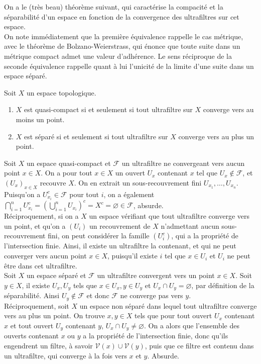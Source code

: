 \documentclass{article}
\begin{document}
On a le (très beau) théorème suivant, qui caractérise la compacité et la séparabilité d'un espace en fonction de la convergence des ultrafiltres sur cet espace.\\
On note immédiatement que la première équivalence rappelle le cas métrique, avec le théorème de Bolzano-Weierstrass, qui énonce que toute suite dans un métrique compact admet une valeur d'adhérence.
Le sens réciproque de la seconde équivalence rappelle quant à lui l'unicité de la limite d'une suite dans un espace séparé.\\
\begin{theoreme}
    Soit $X$ un espace topologique.
    \begin{enumerate}
        \item $X$ est quasi-compact si et seulement si tout ultrafiltre sur $X$ converge vers au moins un point.
        \item $X$ est séparé si et seulement si tout ultrafiltre sur $X$ converge vers au plus un point.
    \end{enumerate}
\end{theoreme}
\begin{preuve}
    Soit $X$ un espace quasi-compact et $\mathcal{F}$ un ultrafiltre ne convergeant vers aucun point $x \in X$. On a pour tout $x \in X$ un ouvert $U_x$ contenant $x$ tel que $U_x \not\in \mathcal{F}$, et $(U_x)_{x \in X}$ recouvre $X$. On en extrait un sous-recouvrement fini $U_{x_1}, \ldots, U_{x_n}$.\\
    Puisqu'on a $U_{x_i}^c \in \mathcal{F}$ pour tout $i$, on a également $\bigcap_{i=1}^{n}{U_{x_i}^c} = \left(\bigcup_{i=1}^{n}{U_{x_i}}\right)^c = X^c = \varnothing \in \mathcal{F}$, absurde.\\

    Réciproquement, si on a $X$ un espace vérifiant que tout ultrafiltre converge vers un point, et qu'on a $(U_i)$ un recouvrement de $X$ n'admettant aucun sous-recouvrement fini, on peut considérer la famille $(U_i^c)$, qui a la propriété de l'intersection finie. Ainsi, il existe un ultrafiltre la contenant, et qui ne peut converger vers aucun point $x \in X$, puisqu'il existe $i$ tel que $x \in U_i$ et $U_i$ ne peut être dans cet ultrafiltre.\\

    Soit $X$ un espace séparé et $\mathcal{F}$ un ultrafiltre convergent vers un point $x \in X$.
    Soit $y \in X$, il existe $U_x, U_y$ tels que $x \in U_x, y \in U_y$ et $U_x \cap U_y = \varnothing$, par définition de la séparabilité. Ainsi $U_y \not\in \mathcal{F}$ et donc $\mathcal{F}$ ne converge pas vers $y$.\\

    Réciproquement, soit $X$ un espace non séparé dans lequel tout ultrafiltre converge vers au plus un point.
    On trouve $x, y \in X$ tels que pour tout ouvert $U_x$ contenant $x$ et tout ouvert $U_y$ contenant $y$, $U_x \cap U_y \neq \varnothing$. On a alors que l'ensemble des ouverts contenant $x$ ou $y$ a la propriété de l'intersection finie, donc qu'ils engendrent un filtre, à savoir $\mathcal{V}(x) \cup \mathcal{V}(y)$, puis que ce filtre est contenu dans un ultrafiltre, qui converge à la fois vers $x$ et $y$. Absurde.
\end{preuve}
\end{document}
